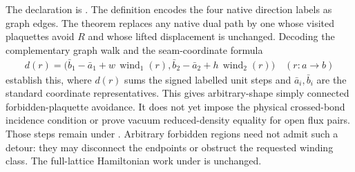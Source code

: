 \documentclass{article}
\begin{document}
The declaration is
.
The definition  encodes the four
native direction labels as graph edges. The theorem
replaces any native dual path by one whose visited plaquettes avoid $R$ and
whose lifted displacement is unchanged. Decoding the complementary graph walk
and the seam-coordinate formula
\begin{align}
    d(r)=\bigl(\bar b_1-\bar a_1+w\,\operatorname{wind}_1(r),
              \bar b_2-\bar a_2+h\,\operatorname{wind}_2(r)\bigr)
    \quad(r:a\to b)
    \label{eq:flux_avoidance_displacement}
\end{align}
establish this, where $d(r)$ sums the signed labelled unit steps and
$\bar a_i,\bar b_i$ are the standard coordinate representatives. This gives arbitrary-shape simply connected forbidden-plaquette
avoidance. It does not yet impose the physical crossed-bond incidence
condition or prove vacuum reduced-density equality for open flux pairs. Those steps remain
under . Arbitrary forbidden regions need not admit such a detour:
they may disconnect the endpoints or obstruct the requested winding class.
The full-lattice Hamiltonian work under  is unchanged.


\end{document}
